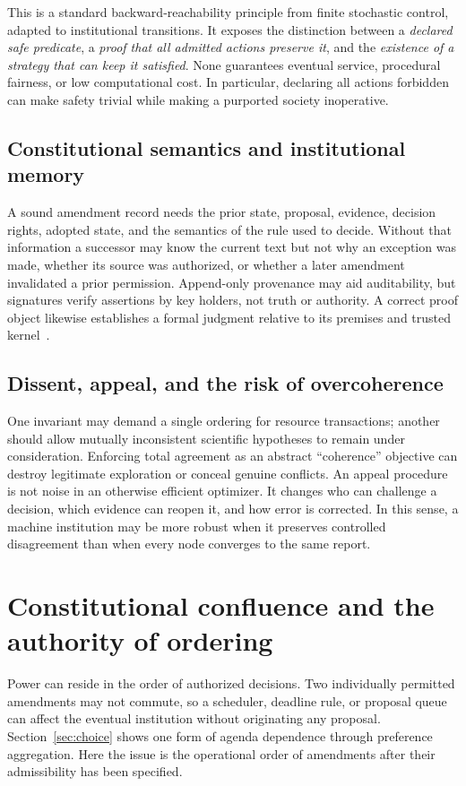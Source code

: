 \documentclass[11pt,letterpaper]{article}
\theoremstyle{plain}
\theoremstyle{definition}
\theoremstyle{remark}
\begin{document}
This is a standard backward-reachability principle from finite stochastic control, adapted to institutional transitions. It exposes the distinction between a \emph{declared safe predicate}, a \emph{proof that all admitted actions preserve it}, and the \emph{existence of a strategy that can keep it satisfied}. None guarantees eventual service, procedural fairness, or low computational cost. In particular, declaring all actions forbidden can make safety trivial while making a purported society inoperative.

\subsection{Constitutional semantics and institutional memory}

A sound amendment record needs the prior state, proposal, evidence, decision rights, adopted state, and the semantics of the rule used to decide. Without that information a successor may know the current text but not why an exception was made, whether its source was authorized, or whether a later amendment invalidated a prior permission. Append-only provenance may aid auditability, but signatures verify assertions by key holders, not truth or authority. A correct proof object likewise establishes a formal judgment relative to its premises and trusted kernel~\cite{necula}.

\subsection{Dissent, appeal, and the risk of overcoherence}

One invariant may demand a single ordering for resource transactions; another should allow mutually inconsistent scientific hypotheses to remain under consideration. Enforcing total agreement as an abstract ``coherence'' objective can destroy legitimate exploration or conceal genuine conflicts. An appeal procedure is not noise in an otherwise efficient optimizer. It changes who can challenge a decision, which evidence can reopen it, and how error is corrected. In this sense, a machine institution may be more robust when it preserves controlled disagreement than when every node converges to the same report.


\section{Constitutional confluence and the authority of ordering}\label{sec:confluence}
Power can reside in the order of authorized decisions. Two individually permitted amendments may not commute, so a scheduler, deadline rule, or proposal queue can affect the eventual institution without originating any proposal. Section~\ref{sec:choice} shows one form of agenda dependence through preference aggregation. Here the issue is the operational order of amendments after their admissibility has been specified.
\end{document}
